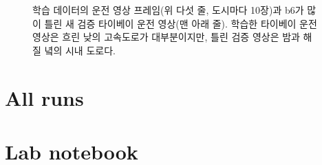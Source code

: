 \documentclass[11pt]{article}
\begin{document}
\begin{figure}[H]\centering
{}
\caption{학습 데이터의 운전 영상 프레임(위 다섯 줄, 도시마다 10장)과 b6가 많이 틀린 새 검증 타이베이 운전 영상(맨 아래 줄). 학습한 타이베이 운전 영상은 흐린 낮의 고속도로가 대부분이지만, 틀린 검증 영상은 밤과 해 질 녘의 시내 도로다.}
\label{fig:roads}
\end{figure}

\section*{All runs}

\section*{Lab notebook}
\end{document}
